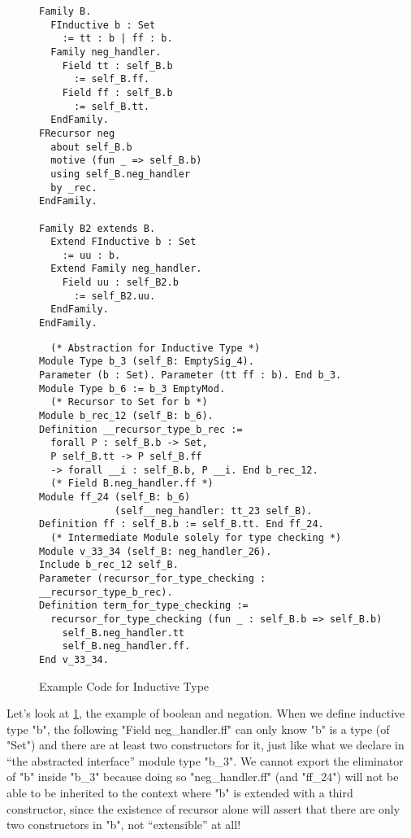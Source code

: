\begin{figure}
  \begin{minipage}[t]{0.3\linewidth}
\begin{verbatim}
Family B.
  FInductive b : Set 
    := tt : b | ff : b.
  Family neg_handler. 
    Field tt : self_B.b 
      := self_B.ff.
    Field ff : self_B.b 
      := self_B.tt.
  EndFamily.
FRecursor neg 
  about self_B.b 
  motive (fun _ => self_B.b)
  using self_B.neg_handler
  by _rec.
EndFamily.

Family B2 extends B.
  Extend FInductive b : Set 
    := uu : b.
  Extend Family neg_handler. 
    Field uu : self_B2.b 
      := self_B2.uu.
  EndFamily. 
EndFamily.
\end{verbatim}
  \end{minipage}
  \begin{minipage}[t]{0.65\linewidth}
\begin{verbatim}
  (* Abstraction for Inductive Type *)
Module Type b_3 (self_B: EmptySig_4).
Parameter (b : Set). Parameter (tt ff : b). End b_3.      
Module Type b_6 := b_3 EmptyMod.
  (* Recursor to Set for b *)
Module b_rec_12 (self_B: b_6).
Definition __recursor_type_b_rec :=
  forall P : self_B.b -> Set,
  P self_B.tt -> P self_B.ff 
  -> forall __i : self_B.b, P __i. End b_rec_12. 
  (* Field B.neg_handler.ff *)
Module ff_24 (self_B: b_6) 
             (self__neg_handler: tt_23 self_B).
Definition ff : self_B.b := self_B.tt. End ff_24.
  (* Intermediate Module solely for type checking *)
Module v_33_34 (self_B: neg_handler_26).
Include b_rec_12 self_B.
Parameter (recursor_for_type_checking : __recursor_type_b_rec).
Definition term_for_type_checking :=
  recursor_for_type_checking (fun _ : self_B.b => self_B.b)
    self_B.neg_handler.tt
    self_B.neg_handler.ff.  
End v_33_34.
\end{verbatim}
  \end{minipage}
\caption{Example Code for Inductive Type}\label{fig:plugin-example2}
\end{figure}

Let's look at \cref{fig:plugin-example2}, the example of boolean and negation. When we define inductive type "b", the following "Field neg_handler.ff" can only know "b" is a type (of "Set") and there are at least two constructors for it, just like what we declare in ``the abstracted interface'' module type "b_3". We cannot export the eliminator of "b" inside "b_3" because doing so "neg_handler.ff" (and "ff_24") will not be able to be inherited to the context where "b" is extended with a third constructor, since the existence of recursor alone will assert that there are only two constructors in "b", not ``extensible'' at all!   

